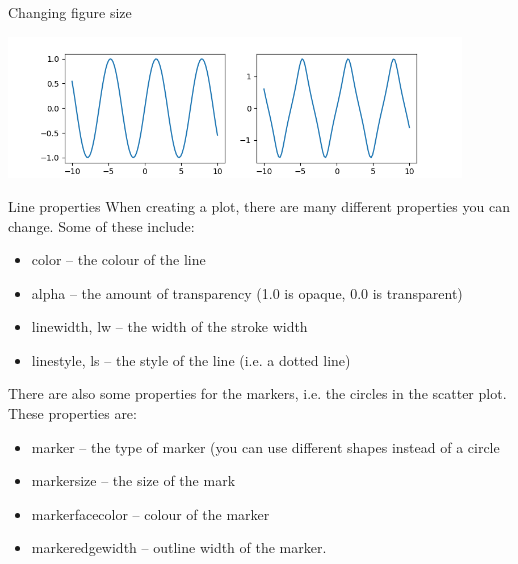 \documentclass[10pt]{beamer}
\begin{document}
\begin{frame}[label={sec:org5053699}]{Changing figure size}
\begin{center}
\includegraphics[width=0.9\textwidth]{images/figsize-2.png}
\end{center}
\end{frame}

\begin{frame}[label={sec:org74e1a3d}]{Line properties}
When creating a plot, there are many different properties you can change. Some
of these include:

\begin{itemize}
\item color -- the colour of the line
\item alpha -- the amount of transparency (1.0 is opaque, 0.0 is transparent)
\item linewidth, lw -- the width of the stroke width
\item linestyle, ls -- the style of the line (i.e. a dotted line)
\end{itemize}

There are also some properties for the markers, i.e. the circles in the scatter
plot. These properties are:

\begin{itemize}
\item marker -- the type of marker (you can use different shapes instead of a circle
\item markersize -- the size of the mark
\item markerfacecolor -- colour of the marker
\item markeredgewidth -- outline width of the marker.
\end{itemize}
\end{frame}
\end{document}

